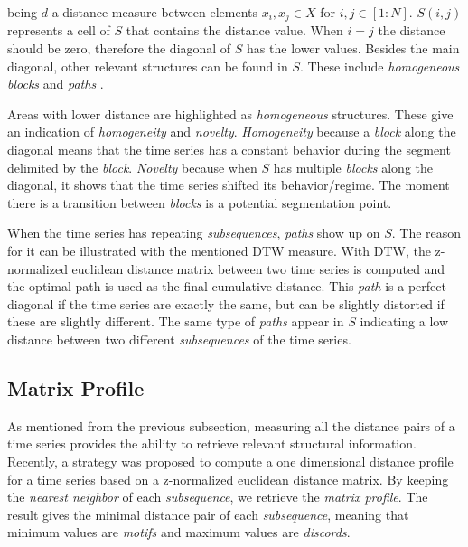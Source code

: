 being $d$ a distance measure between elements $x_i,x_j \in X$ for $i,j \in [1:N]$. $S(i,j)$ represents a cell of $S$ that contains the distance value. When $i=j$ the distance should be zero, therefore the diagonal of $S$ has the lower values. Besides the main diagonal, other relevant structures can be found in $S$. These include \textit{homogeneous blocks} and \textit{paths} \cite{fmp, muller}. 
\par
Areas with lower distance are highlighted as \textit{homogeneous} structures. These give an indication of \textit{homogeneity} and \textit{novelty}. \textit{Homogeneity} because a \textit{block} along the diagonal means that the time series has a constant behavior during the segment delimited by the \textit{block}. \textit{Novelty} because when $S$ has multiple \textit{blocks} along the diagonal, it shows that the time series shifted its behavior/regime. The moment there is a transition between \textit{blocks} is a potential segmentation point.
\par
When the time series has repeating \textit{subsequences}, \textit{paths} show up on $S$. The reason for it can be illustrated with the mentioned DTW measure. With DTW, the z-normalized euclidean distance matrix between two time series is computed and the optimal path is used as the final cumulative distance. This \textit{path} is a perfect diagonal if the time series are exactly the same, but can be slightly distorted if these are slightly different. The same type of \textit{paths} appear in $S$ indicating a low distance between two different \textit{subsequences} of the time series.


\subsection{Matrix Profile}
\label{subsec:matrixprofile}

As mentioned from the previous subsection, measuring all the distance pairs of a time series provides the ability to retrieve relevant structural information. Recently, a strategy was proposed to compute a one dimensional distance profile for a time series based on a z-normalized euclidean distance matrix. By keeping the \textit{nearest neighbor} of each \textit{subsequence}, we retrieve the \textit{matrix profile}. The result gives the minimal distance pair of each \textit{subsequence}, meaning that minimum values are \textit{motifs} and maximum values are \textit{discords}.
\par



